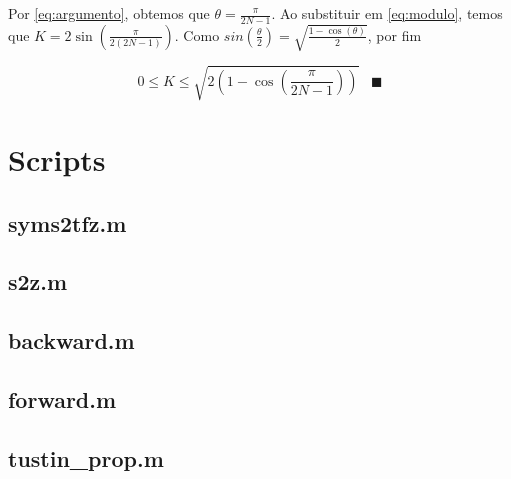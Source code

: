 \documentclass[twoside, fleqn]{article}
\begin{document}
    Por \eqref{eq:argumento}, obtemos que $\theta = \frac{\pi}{2N - 1}$. Ao substituir em \eqref{eq:modulo}, temos que $K = 2 \sin\left(\frac{\pi}{2 (2N - 1)}\right)$. Como $sin\left(\frac{\theta}{2}\right) = \sqrt{\frac{1 -\cos(\theta)}{2}}$, por fim
    
    \begin{equation}
        0 \leq K \leq \sqrt{2 \left(1 - \cos\left(\frac{\pi}{2N - 1}\right)\right)} \hspace{10pt} \blacksquare
    \end{equation}

\newpage

\section*{Scripts}
    \subsection*{syms2tfz.m}
    \label{subsec:syms2tfz}
    
    
    \subsection*{s2z.m}
    \label{subsec:s2z}
    
    
    \subsection*{backward.m}
    \label{subsec:backward}
    
    
    \subsection*{forward.m}
    \label{subsec:forward}
    
    
    \subsection*{tustin\_prop.m}
    \label{subsec:tustin}
    
\end{document}
